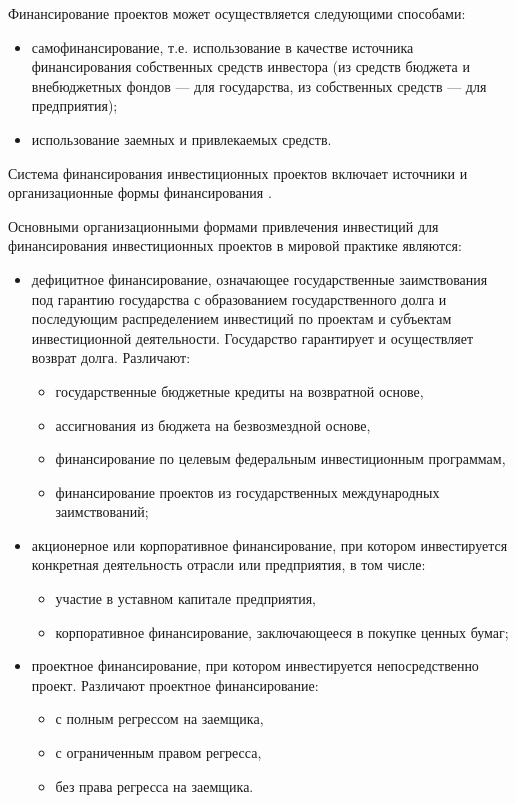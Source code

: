 Финансирование проектов может осуществляется следующими способами:
\begin{itemize}
	\item самофинансирование, т.е. использование в качестве источника финансирования собственных средств инвестора (из средств бюджета и внебюджетных фондов --- для государства, из собственных средств --- для предприятия);
	\item использование заемных и привлекаемых средств.
\end{itemize}

Система финансирования инвестиционных проектов включает источники и организационные формы финансирования \cite[268--269]{mazur}.

Основными организационными формами привлечения инвестиций для финансирования инвестиционных проектов в мировой практике являются:
\begin{itemize}
\item  дефицитное финансирование, означающее государственные заимствования под гарантию государства с образованием государственного долга и последующим распределением инвестиций по проектам и субъектам инвестиционной деятельности. Государство гарантирует и осуществляет возврат долга. Различают:
	\begin{itemize}
		\item государственные бюджетные кредиты на возвратной основе,
		\item ассигнования из бюджета на безвозмездной основе,
		\item финансирование по целевым федеральным инвестиционным программам,
		\item финансирование проектов из государственных международных заимствований;
	\end{itemize}
\item акционерное или корпоративное финансирование, при котором инвестируется конкретная деятельность отрасли или предприятия, в том числе:
	\begin{itemize}
		\item участие в уставном капитале предприятия,
		\item корпоративное финансирование, заключающееся в покупке ценных бумаг;
	\end{itemize}
\item проектное финансирование, при котором инвестируется непосредственно проект. Различают проектное финансирование:
	\begin{itemize}
		\item с полным регрессом на заемщика,
		\item с ограниченным правом регресса,
		\item без права регресса на заемщика.
	\end{itemize}
\end{itemize}

